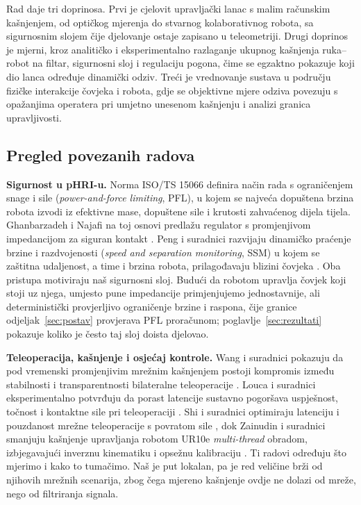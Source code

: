 Rad daje tri doprinosa. Prvi je cjelovit upravljački lanac s malim računskim kašnjenjem,
od optičkog mjerenja do stvarnog kolaborativnog robota, sa sigurnosnim slojem
čije djelovanje ostaje zapisano u teleometriji. Drugi doprinos je mjerni, kroz
analitičko i eksperimentalno razlaganje ukupnog kašnjenja ruka--robot na filtar, sigurnosni sloj i regulaciju pogona,
čime se egzaktno pokazuje koji dio lanca određuje dinamički odziv. Treći je vrednovanje
sustava u području fizičke interakcije čovjeka i robota, gdje se objektivne mjere
odziva povezuju s opažanjima operatera pri umjetno unesenom kašnjenju i analizi
granica upravljivosti.

\subsection{Pregled povezanih radova}

\textbf{Sigurnost u pHRI-u.} Norma ISO/TS 15066 definira način rada s
ograničenjem snage i sile (\emph{power-and-force limiting}, PFL), u kojem se
najveća dopuštena brzina robota izvodi iz efektivne mase, dopuštene sile i
krutosti zahvaćenog dijela tijela. Ghanbarzadeh i Najafi na toj osnovi predlažu
regulator s promjenjivom impedancijom za siguran kontakt
\cite[str.~4]{ghanbarzadeh2025}. Peng i suradnici razvijaju dinamičko praćenje
brzine i razdvojenosti (\emph{speed and separation monitoring}, SSM) u kojem se
zaštitna udaljenost, a time i brzina robota, prilagođavaju blizini čovjeka
\cite[str.~1]{peng2025}. Oba pristupa motiviraju naš sigurnosni sloj. Budući da
robotom upravlja čovjek koji stoji uz njega, umjesto pune impedancije
primjenjujemo jednostavnije, ali deterministički provjerljivo ograničenje brzine
i raspona, čije granice odjeljak~\ref{sec:postav} provjerava PFL proračunom;
poglavlje~\ref{sec:rezultati} pokazuje koliko je često taj sloj doista djelovao.

\textbf{Teleoperacija, kašnjenje i osjećaj kontrole.} Wang i suradnici pokazuju
da pod vremenski promjenjivim mrežnim kašnjenjem postoji kompromis između
stabilnosti i transparentnosti bilateralne teleoperacije
\cite[str.~5]{wang2025}. Louca i suradnici eksperimentalno potvrđuju da porast
latencije sustavno pogoršava uspješnost, točnost i kontaktne sile pri
teleoperaciji \cite[str.~14]{louca2024}. Shi i suradnici optimiraju latenciju i
pouzdanost mrežne teleoperacije s povratom sile \cite[str.~9]{shi2025}, dok
Zainudin i suradnici smanjuju kašnjenje upravljanja robotom UR10e
\textit{multi-thread} obradom, izbjegavajući inverznu kinematiku i
opsežnu kalibraciju \cite[str.~2]{zainudin2025}. Ti radovi određuju što mjerimo
i kako to tumačimo. Naš je put lokalan, pa je red veličine brži od njihovih
mrežnih scenarija, zbog čega mjereno kašnjenje ovdje ne dolazi
od mreže, nego od filtriranja signala.

